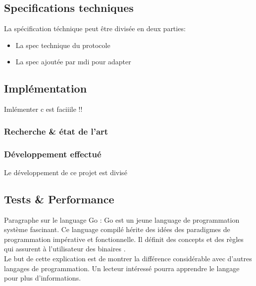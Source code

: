        

    \subsection{Specifications techniques}
        La spécification téchnique peut être divisée en deux parties:
        \begin{itemize}
            \renewcommand{\labelitemi}{$\bullet$}
            \item La spec technique du protocole
            \item La spec ajoutée par \gls{mdi} pour adapter
        \end{itemize}
        \bigskip
       

    \subsection{Implémentation}
    Imlémenter c est faciiile !! 
        \subsubsection{Recherche \& état de l'art}
            

           
        \pagebreak

        \subsubsection{Développement effectué}
            Le développement de ce projet est divisé 

    \subsection{Tests \& Performance}
       


    Paragraphe sur le language Go : 
    Go est un jeune language de programmation système
    fascinant. Ce language compilé hérite des idées des paradigmes de
    programmation impérative et fonctionnelle. Il définit des concepts et
    des règles qui assurent à l'utilisateur des binaires .\\[0.3cm]
   
  
    Le but de cette explication est de montrer la différence considérable
    avec d'autres langages de programmation. Un lecteur intéressé pourra
    apprendre le langage pour plus d'informations.

